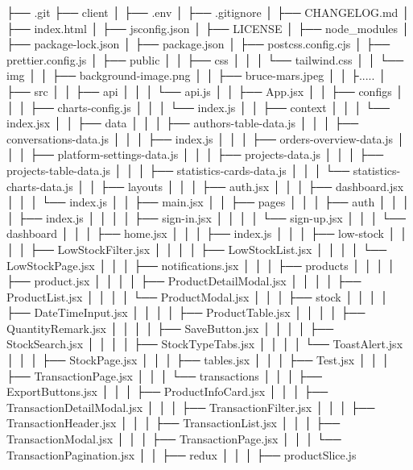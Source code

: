 ├── .git
├── client
│   ├── .env
│   ├── .gitignore
│   ├── CHANGELOG.md
│   ├── index.html
│   ├── jsconfig.json
│   ├── LICENSE
│   ├── node_modules
│   ├── package-lock.json
│   ├── package.json
│   ├── postcss.config.cjs
│   ├── prettier.config.js
│   ├── public
│   │   ├── css
│   │   │   └── tailwind.css
│   │   └── img
│   │       ├── background-image.png
│   │       ├── bruce-mars.jpeg
│   │       ├.....
│   ├── src
│   │   ├── api
│   │   │   └── api.js
│   │   ├── App.jsx
│   │   ├── configs
│   │   │   ├── charts-config.js
│   │   │   └── index.js
│   │   ├── context
│   │   │   └── index.jsx
│   │   ├── data
│   │   │   ├── authors-table-data.js
│   │   │   ├── conversations-data.js
│   │   │   ├── index.js
│   │   │   ├── orders-overview-data.js
│   │   │   ├── platform-settings-data.js
│   │   │   ├── projects-data.js
│   │   │   ├── projects-table-data.js
│   │   │   ├── statistics-cards-data.js
│   │   │   └── statistics-charts-data.js
│   │   ├── layouts
│   │   │   ├── auth.jsx
│   │   │   ├── dashboard.jsx
│   │   │   └── index.js
│   │   ├── main.jsx
│   │   ├── pages
│   │   │   ├── auth
│   │   │   │   ├── index.js
│   │   │   │   ├── sign-in.jsx
│   │   │   │   └── sign-up.jsx
│   │   │   └── dashboard
│   │   │       ├── home.jsx
│   │   │       ├── index.js
│   │   │       ├── low-stock
│   │   │       │   ├── LowStockFilter.jsx
│   │   │       │   ├── LowStockList.jsx
│   │   │       │   └── LowStockPage.jsx
│   │   │       ├── notifications.jsx
│   │   │       ├── products
│   │   │       │   ├── product.jsx
│   │   │       │   ├── ProductDetailModal.jsx
│   │   │       │   ├── ProductList.jsx
│   │   │       │   └── ProductModal.jsx
│   │   │       ├── stock
│   │   │       │   ├── DateTimeInput.jsx
│   │   │       │   ├── ProductTable.jsx
│   │   │       │   ├── QuantityRemark.jsx
│   │   │       │   ├── SaveButton.jsx
│   │   │       │   ├── StockSearch.jsx
│   │   │       │   ├── StockTypeTabs.jsx
│   │   │       │   └── ToastAlert.jsx
│   │   │       ├── StockPage.jsx
│   │   │       ├── tables.jsx
│   │   │       ├── Test.jsx
│   │   │       ├── TransactionPage.jsx
│   │   │       └── transactions
│   │   │           ├── ExportButtons.jsx
│   │   │           ├── ProductInfoCard.jsx
│   │   │           ├── TransactionDetailModal.jsx
│   │   │           ├── TransactionFilter.jsx
│   │   │           ├── TransactionHeader.jsx
│   │   │           ├── TransactionList.jsx
│   │   │           ├── TransactionModal.jsx
│   │   │           ├── TransactionPage.jsx
│   │   │           └── TransactionPagination.jsx
│   │   ├── redux
│   │   │   ├── productSlice.js
